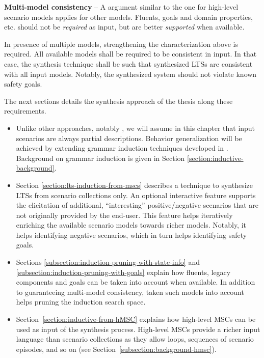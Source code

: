 \begin{description}
\item{\textbf{Multi-model consistency}} -- A argument similar to the one for high-level scenario models applies for other models. Fluents, goals and domain properties, etc. should not be \emph{required} as input, but are better \emph{supported} when available. 

In presence of multiple models, strengthening the characterization above is required. All available models shall be required to be consistent in input. In that case, the synthesis technique shall be such that synthesized LTSs are consistent with all input models. Notably, the synthesized system should not violate known safety goals.

\end{description}

The next sections details the synthesis approach of the thesis along these requirements. 

\begin{itemize}

\item Unlike other approaches, notably \cite{Uchitel:2003}, we will assume in this chapter that input scenarios are always partial descriptions. Behavior generalization will be achieved by extending grammar induction techniques developed in \cite{Oncina:1992, Dupont:1996b}. Background on grammar induction is given in Section \ref{section:inductive-background}. 

\item Section \ref{section:lts-induction-from-mscs} describes a technique to synthesize LTSs from scenario collections only. An optional interactive feature supports the elicitation of additional, ``interesting'' positive/negative scenarios that are not originally provided by the end-user. This feature helps iteratively enriching the available scenario models towards richer models. Notably, it helps identifying negative scenarios, which in turn helps identifying safety goals.

\item Sections \ref{subsection:induction-pruning-with-state-info} and \ref{subsection:induction-pruning-with-goals} explain how fluents, legacy components and goals can be taken into account when available. In addition to guaranteeing multi-model consistency, taken such models into account helps pruning the induction search space. 

\item Section~\ref{section:inductive-from-hMSC} explains how high-level MSCs can be used as input of the synthesis process. High-level MSCs provide a richer input language than scenario collections as they allow loops, sequences of scenario episodes, and so on (see Section~\ref{subsection:background-hmsc}). 

\end{itemize}
